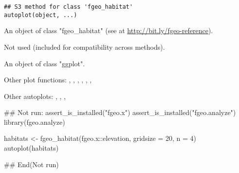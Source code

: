 \documentclass[a4paper]{book}
\begin{document}
%
\begin{Usage}
\begin{verbatim}
## S3 method for class 'fgeo_habitat'
autoplot(object, ...)
\end{verbatim}
\end{Usage}
%
\begin{Arguments}
\begin{ldescription}
\item[\code{object}] An object of class "fgeo\_habitat" (see  at
\url{http://bit.ly/fgeo-reference}).

\item[\code{...}] Not used (included for compatibility across methods).
\end{ldescription}
\end{Arguments}
%
\begin{Value}
An object of class "ggplot".
\end{Value}
%
\begin{SeeAlso}\relax
Other plot functions: ,
,
,
,
,
, 

Other autoplots: ,
, ,
\end{SeeAlso}
%
\begin{Examples}
\begin{ExampleCode}
## Not run: 
assert_is_installed("fgeo.x")
assert_is_installed("fgeo.analyze")
library(fgeo.analyze)

habitats <- fgeo_habitat(fgeo.x::elevation, gridsize = 20, n = 4)
autoplot(habitats)

## End(Not run)
\end{ExampleCode}
\end{Examples}
%
\end{document}
